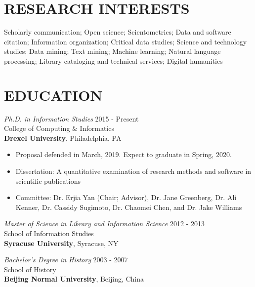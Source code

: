 \documentclass[margin, 10pt]{res} %
\begin{document}
\begin{resume}

 
\section{RESEARCH INTERESTS}  

Scholarly communication; Open science; Scientometrics; Data and software citation; Information organization; Critical data studies; Science and technology studies; Data mining; Text mining; Machine learning; Natural language processing; Library cataloging and technical services; Digital humanities

 
\section{EDUCATION}

{\sl Ph.D. in Information Studies} \hfill 2015 - Present \\
College of Computing \& Informatics\\
\textbf{Drexel University}, Philadelphia, PA
\begin{itemize}
\item Proposal defended in March, 2019. Expect to graduate in Spring, 2020.
\item Dissertation: A quantitative examination of research methods and software in scientific publications
\item Committee: Dr. Erjia Yan (Chair; Advisor), Dr. Jane Greenberg, Dr. Ali Kenner, Dr. Cassidy Sugimoto, Dr. Chaomei Chen, and Dr. Jake Williams
\end{itemize} 

{\sl Master of Science in Library and Information Science} \hfill 2012 - 2013 \\
School of Information Studies\\
\textbf{Syracuse University}, Syracuse, NY
 
{\sl Bachelor’s Degree in History} \hfill 2003 - 2007\\
School of History\\
\textbf{Beijing Normal University}, Beijing, China


\end{resume}
\end{document}
